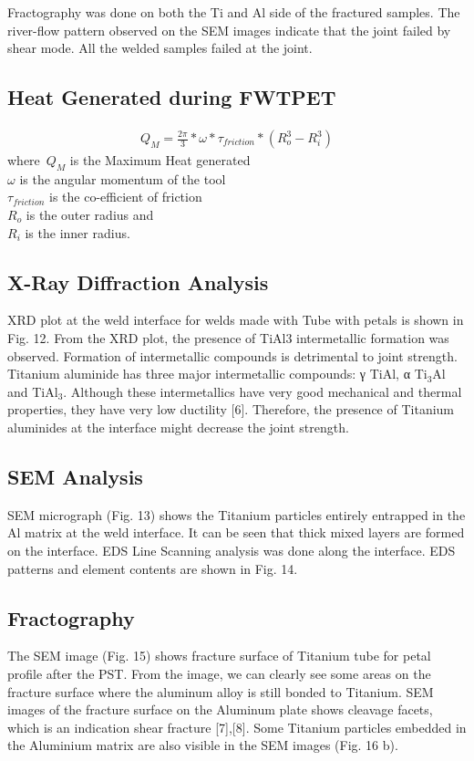 \documentclass[3p]{elsarticle}
\begin{document}
\par
Fractography was done on both the Ti and Al side of the fractured samples. The river-flow pattern observed on the SEM images indicate that the joint failed by shear mode. All the welded samples failed at the joint.

\subsection{Heat Generated during FWTPET}
\label{subsec:Heat Generated during FWTPET}
\begin{gather} \label{eq:heat-input}
Q_{M} = \frac{2\pi}{3} *  \omega * \tau_{friction} * (R^{3}_{o} - R^{3}_{i})
\end{gather}
where~$Q_{M}$ is the Maximum Heat generated \\
$\omega$ is the angular momentum of the tool \\
$\tau_{friction}$ is the co-efficient of friction \\
$R_{o}$ is the outer radius and  \\
$R_{i}$ is the inner radius.

\subsection{X-Ray Diffraction Analysis}
\label{subsec:XRD-Results}
XRD plot at the weld interface for welds made with Tube with petals is shown in Fig. 12. From the XRD plot, the
presence of TiAl3 intermetallic formation was observed. Formation of intermetallic compounds is detrimental to joint strength. Titanium aluminide has three major intermetallic compounds: γ TiAl, α Ti$_{3}$Al and TiAl$_{3}$. Although these intermetallics have very good mechanical and thermal properties, they have very low ductility [6]. Therefore, the presence of Titanium aluminides at the interface might decrease the joint strength.

\subsection{SEM Analysis}
\label{subsec:SEM Analysis}
SEM micrograph (Fig. 13) shows the Titanium particles entirely entrapped in the Al matrix at the weld interface. It can be seen that thick mixed layers are formed on the interface. EDS Line Scanning analysis was done along the interface. EDS patterns and element contents are shown in Fig. 14.

\subsection{Fractography}
\label{subsec:Fractography}
The SEM image (Fig. 15) shows fracture surface of Titanium tube for petal profile after the PST. From the image, we can clearly see some areas on the fracture surface where the aluminum alloy is still bonded to Titanium. SEM images of the fracture surface on the Aluminum plate shows cleavage facets, which is an indication shear fracture [7],[8]. Some Titanium particles embedded in the Aluminium matrix are also visible in
the SEM images (Fig. 16 b).
\end{document}
